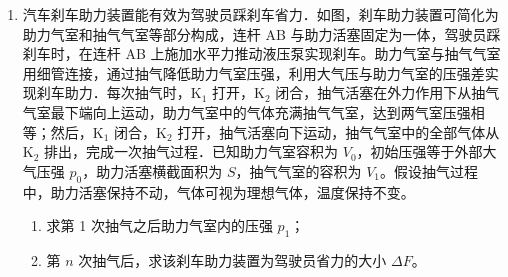 \documentclass[\gkver]{gaokaozhenti}
\begin{document}
\begin{enumerate}
\item
汽车刹车助力装置能有效为驾驶员踩刹车省力．如图，刹车助力装置可简化为助力气室和抽气气室等部分构成，连杆 AB 与助力活塞固定为一体，驾驶员踩刹车时，在连杆 AB 上施加水平力推动液压泵实现刹车。助力气室与抽气气室用细管连接，通过抽气降低助力气室压强，利用大气压与助力气室的压强差实现刹车助力．每次抽气时，K$_{1}$ 打开，K$_{2}$ 闭合，抽气活塞在外力作用下从抽气气室最下端向上运动，助力气室中的气体充满抽气气室，达到两气室压强相等；然后，K$_{1}$ 闭合，K$_{2}$ 打开，抽气活塞向下运动，抽气气室中的全部气体从 K$_{2}$ 排出，完成一次抽气过程．已知助力气室容积为 $V_{0}$，初始压强等于外部大气压强 $p_{0}$，助力活塞横截面积为 $S$，抽气气室的容积为 $V_{1}$。假设抽气过程中，助力活塞保持不动，气体可视为理想气体，温度保持不变。
\begin{enumerate}
	\item
	求第 1 次抽气之后助力气室内的压强 $p_{1}$；
	\item
	第 $n$ 次抽气后，求该刹车助力装置为驾驶员省力的大小 $\Delta F$。
\end{enumerate}
\end{enumerate}
\end{document}
